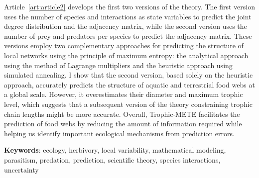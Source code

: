 \documentclass[12pt,twoside,phd]{dms}
\numberwithin{equation}{section}
\numberwithin{table}{chapter}
\numberwithin{figure}{chapter}
\begin{document}
Article~\ref{art:article2} develops the first two versions of the theory. The
first version uses the number of species and interactions as state variables to
predict the joint degree distribution and the adjacency matrix, while the second
version uses the number of prey and predators per species to predict the
adjacency matrix. These versions employ two complementary approaches for
predicting the structure of local networks using the principle of maximum
entropy: the analytical approach using the method of Lagrange multipliers and
the heuristic approach using simulated annealing. I show that the second
version, based solely on the heuristic approach, accurately predicts the
structure of aquatic and terrestrial food webs at a global scale. However, it
overestimates their diameter and maximum trophic level, which suggests that a
subsequent version of the theory constraining trophic chain lengths might be
more accurate. Overall, Trophic-METE facilitates the prediction of food webs by
reducing the amount of information required while helping us identify important
ecological mechanisms from prediction errors.

\textbf{Keywords}: ecology, herbivory, local variability, mathematical modeling,
parasitism, predation, prediction, scientific theory, species interactions,
uncertainty


\francais
\cleardoublepage
{}  %

\setlength{\parskip}{0pt} %

\tableofcontents
\cleardoublepage
{}  %
\listoftables
\cleardoublepage
{}
\listoffigures
\end{document}
